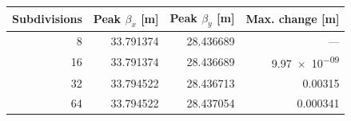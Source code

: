 \begin{tabular}{rrrr}\toprule
Subdivisions & Peak $\beta_x$ [\si{\metre}] & Peak $\beta_y$ [\si{\metre}] & Max. change [\si{\metre}]\\\midrule
8 & 33.791374 & 28.436689 & ---\\
16 & 33.791374 & 28.436689 & \num{9.97e-09}\\
32 & 33.794522 & 28.436713 & \num{0.00315}\\
64 & 33.794522 & 28.437054 & \num{0.000341}\\
\bottomrule\end{tabular}
